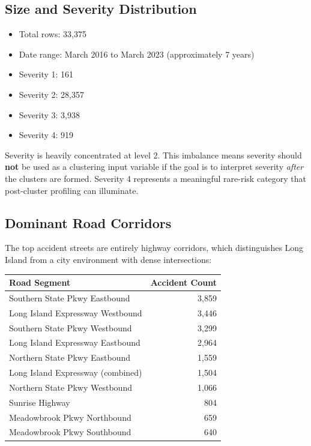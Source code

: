\documentclass[11pt]{article}
\begin{document}
\subsection{Size and Severity Distribution}

\begin{itemize}
\item Total rows: 33,375
\item Date range: March 2016 to March 2023 (approximately 7 years)
\item Severity 1: 161
\item Severity 2: 28,357
\item Severity 3: 3,938
\item Severity 4: 919
\end{itemize}

Severity is heavily concentrated at level 2. This imbalance means severity should \textbf{not} be used as a clustering input variable if the goal is to interpret severity \textit{after} the clusters are formed. Severity 4 represents a meaningful rare-risk category that post-cluster profiling can illuminate.

\subsection{Dominant Road Corridors}

The top accident streets are entirely highway corridors, which distinguishes Long Island from a city environment with dense intersections:

\begin{center}
\begin{tabular}{|l|r|}
\hline
Road Segment & Accident Count \\
\hline
Southern State Pkwy Eastbound & 3,859 \\
Long Island Expressway Westbound & 3,446 \\
Southern State Pkwy Westbound & 3,299 \\
Long Island Expressway Eastbound & 2,964 \\
Northern State Pkwy Eastbound & 1,559 \\
Long Island Expressway (combined) & 1,504 \\
Northern State Pkwy Westbound & 1,066 \\
Sunrise Highway & 804 \\
Meadowbrook Pkwy Northbound & 659 \\
Meadowbrook Pkwy Southbound & 640 \\
\hline
\end{tabular}
\end{center}
\end{document}
